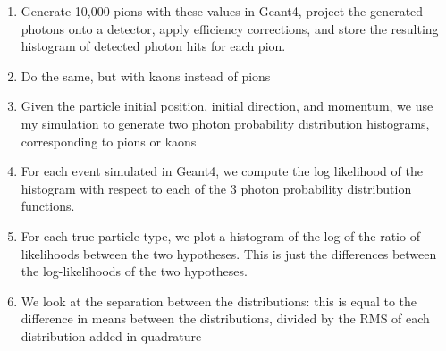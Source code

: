 \begin{enumerate}
\item Generate 10,000 pions with these values in Geant4, project the generated photons onto a detector, apply efficiency corrections, and store the resulting histogram of detected photon hits for each pion. 
\item Do the same, but with kaons instead of pions
\item Given the particle initial position, initial direction, and momentum, we use my simulation to generate two photon probability distribution histograms, corresponding to pions or kaons
\item For each event simulated in Geant4, we compute the log likelihood of the histogram with respect to each of the 3 photon probability distribution functions.
\item For each true particle type, we plot a histogram of the log of the ratio of likelihoods between the two hypotheses.
This is just the differences between the log-likelihoods of the two hypotheses.
\item We look at the separation between the distributions: this is equal to the difference in means between the distributions, divided by the RMS of each distribution added in quadrature
\end{enumerate}


